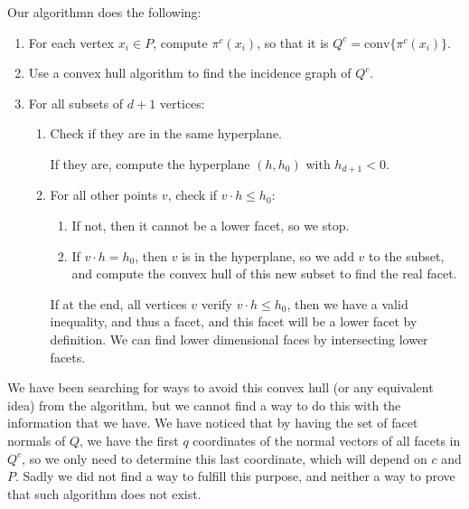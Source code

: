 \documentclass[12pt,a4paper]{article}
\begin{document}
Our algorithmn does the following:
\begin{enumerate}
	\item For each vertex $x_i \in P$, compute $\pi^c(x_i)$, so that it is $Q^c = \text{conv}\{\pi^c(x_i)\}$.
	
	\item Use a convex hull algorithm to find the incidence graph of $Q^c$. 
	
	\item For all subsets of $d+1$ vertices:
	
	\begin{enumerate}
		\item Check if they are in the same hyperplane.
		
		If they are, compute the hyperplane $(h,h_0)$ with $h_{d+1} < 0.$
		
		\item For all other points $v$, check if $v \cdot h \leq h_0$:
		
		\begin{enumerate}
			
			\item If not, then it cannot be a lower facet, so we stop.
			
			\item If $v \cdot h = h_0$, then $v$ is in the hyperplane, so we add $v$ to the subset, and compute the convex hull of this new subset to find the real facet.
			
		\end{enumerate}
	
		If at the end, all vertices $v$ verify $v \cdot h \leq h_0$, then we have a valid inequality, and thus a facet, and this facet will be a lower facet by definition. We can find lower dimensional faces by intersecting lower facets.
				
	\end{enumerate}
		
\end{enumerate}

We have been searching for ways to avoid this convex hull (or any equivalent idea) from the algorithm, but we cannot find a way to do this with the information that we have. We have noticed that by having the set of facet normals of $Q$, we have the first $q$ coordinates of the normal vectors of all facets in $Q^c$, so we only need to determine this last coordinate, which will depend on $c$ and $P$. Sadly we did not find a way to fulfill this purpose, and neither a way to prove that such algorithm does not exist. 
\end{document}

